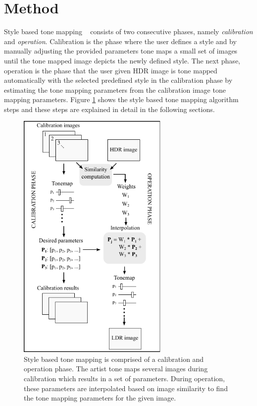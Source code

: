 \section{Method}
Style based tone mapping ~\cite{akyuz2013style} consists of two consecutive phases, namely \emph{calibration} and \emph{operation}. Calibration is the phase where the user defines a style and by manually adjusting the provided parameters tone maps a small set of images until the tone mapped image depicts the newly defined style. The next phase, operation is the phase that the user given HDR image is tone mapped automatically with the selected predefined style in the calibration phase by estimating the tone mapping parameters from the calibration image tone mapping parameters. Figure \ref{fig:calibration_operation} shows the style based tone mapping algorithm steps and these steps are explained in detail in the following sections.

\begin{figure}
\begin{center}
\includegraphics[width=0.65\textwidth]{figures/chapter5/algorithm.pdf}
\caption{Style based tone mapping is comprised of a calibration and operation phase. The artist tone maps several images during calibration which results in a set of parameters. During operation, these parameters are interpolated based on image similarity to find the tone mapping parameters for the given image.}
\label{fig:calibration_operation}
\end{center}
\end{figure}


